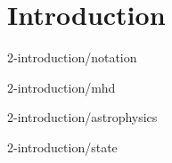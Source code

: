 \tableofcontents

\chapter{Introduction}
\setcounter{page}{1}

 {2-introduction/notation}

 {2-introduction/mhd}

 {2-introduction/astrophysics}

 {2-introduction/state}